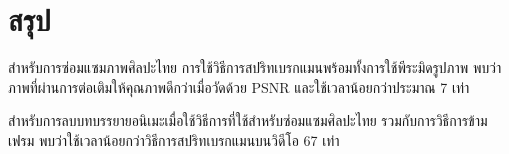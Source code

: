 \chapter{สรุป}
\vspace{2cm}

\hspace{1cm} สำหรับการซ่อมแซมภาพศิลปะไทย การใช้วิธีการสปริทเบรกแมนพร้อมทั้งการใช้พีระมิดรูปภาพ พบว่าภาพที่ผ่านการต่อเติมให้คุณภาพดีกว่าเมื่อวัดด้วย PSNR และใช้เวลาน้อยกว่าประมาณ 7 เท่า

\hspace{1cm} สำหรับการลบบทบรรยายอนิเมะเมื่อใช้วิธีการที่ใช้สำหรับซ่อมแซมศิลปะไทย รวมกับการวิธีการข้ามเฟรม พบว่าใช้เวลาน้อยกว่าวิธีการสปริทเบรกแมนบนวิดีโอ 67 เท่า

\clearpage